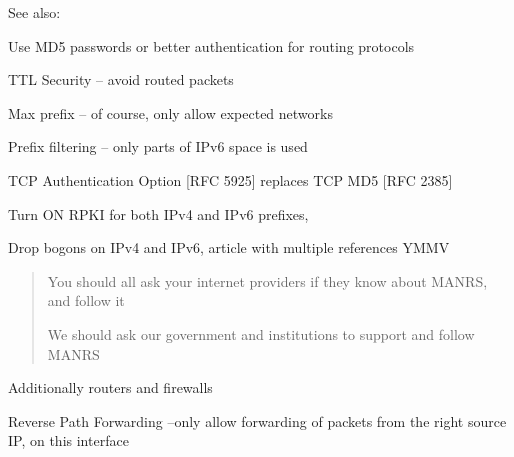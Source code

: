\documentclass[Screen16to9,17pt]{foils}
\newcommand{\myalert}{\color{red}\faFlag}
\begin{document}
See also: {\small{}}




{\myalert}
\begin{list2}
\item Use MD5 passwords or better authentication for routing protocols {\myalert}
\item TTL Security -- avoid routed packets
\item Max prefix -- of course, only allow expected networks
\item Prefix filtering -- only parts of IPv6 space is used
\item TCP Authentication Option [RFC 5925] replaces TCP MD5 [RFC 2385]
\item Turn ON RPKI for both IPv4 and IPv6 prefixes, {\myalert} \\
\item Drop bogons on IPv4 and IPv6, article with multiple references YMMV\\
\end{list2}




\begin{quote}
You should all ask your internet providers if they know about MANRS, and follow it

We should ask our government and institutions to support and follow MANRS
\end{quote}

\begin{list2}
    \item
\end{list2}





\slide{}


\begin{quote}

\end{quote}

Additionally routers and firewalls

\begin{list2}
\item
\item Reverse Path Forwarding --only allow forwarding of packets from the right source IP, on this interface
\end{list2}
\end{document}
